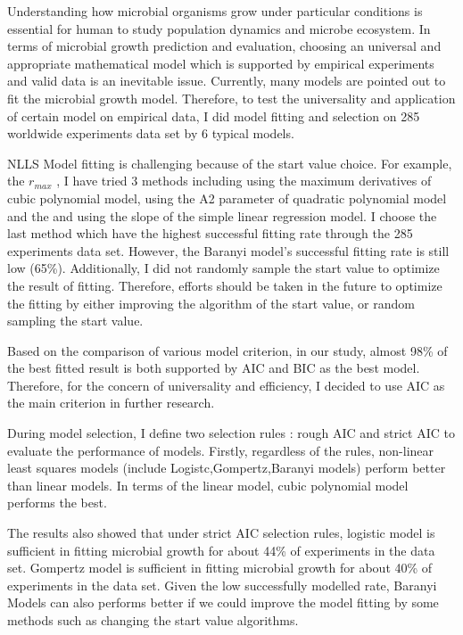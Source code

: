 \documentclass[11pt]{article}
\begin{document}
  Understanding how microbial organisms grow under particular conditions is essential for human to study population dynamics and microbe ecosystem\cite{peleg_microbial_2011}. In terms of microbial growth prediction and evaluation, choosing an universal and appropriate mathematical model which is supported by empirical experiments and valid data is an inevitable issue\cite{tjorve_use_2017}. Currently, many models are pointed out to fit the microbial growth model. Therefore, to test the universality and application of certain model on empirical data, I did model fitting and selection on 285 worldwide experiments data set by 6 typical models. 

  NLLS Model fitting is challenging because of the start value choice. For example, the $r_{max}$ , I have tried 3 methods including using the maximum derivatives of cubic polynomial model, using the A2 parameter of quadratic polynomial model and the and using the slope of the simple linear regression model. I choose the last method which have the highest successful fitting rate through the 285 experiments data set. However, the Baranyi model's successful fitting rate is still low (65\%). Additionally, I did not randomly sample the start value to optimize the result of fitting. Therefore, efforts should be taken in the future to optimize the fitting by either improving the algorithm of the start value, or random sampling the start value. 

  Based on the comparison of various model criterion, in our study, almost 98\% of the best fitted result is both supported by AIC and BIC as the best model. Therefore, for the concern of universality and efficiency, I decided to use AIC as the main criterion in further research.  

  During model selection, I define two selection rules : rough AIC and strict AIC to evaluate the performance of models. Firstly, regardless of the rules, non-linear least squares models (include Logistc,Gompertz,Baranyi models) perform better than linear models. In terms of the linear model, cubic polynomial model performs the best. 

  The results also showed that under strict AIC selection rules, logistic model is sufficient in fitting microbial growth for about 44\% of experiments in the data set. Gompertz model is sufficient in fitting microbial growth for about 40\% of experiments in the data set. Given the low successfully modelled rate, Baranyi Models can also performs better if we could improve the model fitting by some methods such as changing the start value algorithms.
\end{document}
